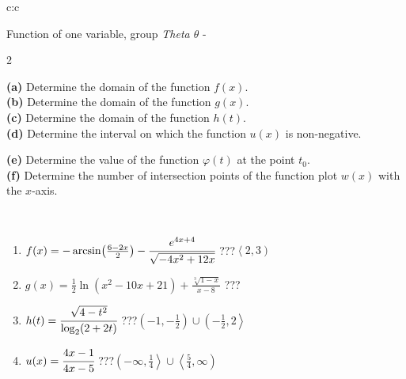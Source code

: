 \documentclass[10pt]{report}
\begin{document}
\begin{tabular}{c:c}
\begin{minipage}[c][104.5mm][t]{0.5\linewidth}
\begin{center}
\vspace{7mm}
{\huge Function of one variable, group \textit{Theta $\theta$} -}\\[5mm]
\begin{minipage}{0.95\linewidth}
\begin{center}
{\small \begin{multicols}{2} \raggedright
\textbf{(a)} Determine the domain of the function \(f(x)\). \\[1mm]
\textbf{(b)} Determine the domain of the function \(g(x)\). \\[1mm]
\textbf{(c)} Determine the domain of the function \(h(t)\). \\[1mm]
\textbf{(d)} Determine the interval on which the function \(u(x)\) is non-negative. \par \columnbreak
\textbf{(e)} Determine the value of the function \(\varphi(t)\) at the point \(t_0\). \\[1mm]
\textbf{(f)} Determine the number of intersection points of the function plot \(w(x)\) with the \(x\)-axis. \\[1mm]
\end{multicols}
}
\end{center}
\end{minipage}
\\[4mm]
\begin{minipage}{0.79\linewidth}
\begin{center}
\begin{varwidth}{\linewidth}
\begin{enumerate}
\small
\item $f(x) = -\arcsin\!\left( \frac{6-2x}{2} \right) - \cfrac{e^{4x+4}}{\sqrt{-4x^2+12x}}$\quad \dotfill\; ???\;\dotfill \quad $\left\langle2 , 3\right)$
\item $g(x) = \frac{1}{2} \ln{\!(x^2-10x+21)}+\frac{\sqrt[3]{1-x}}{x-8}$\quad \dotfill\; ???\;\dotfill {}
\item $h(t) = \cfrac{\sqrt{4-t^2}}{\log_2(2+2t)}$\quad \dotfill\; ???\;\dotfill \quad $\left(-1 , -\frac{1}{2}\right)\cup\left(-\frac{1}{2} , 2\right\rangle$
\item $u(x) = \cfrac{4x-1}{4x-5}$\quad \dotfill\; ???\;\dotfill \quad $\left(-\infty , \frac{1}{4}\right\rangle\cup\left\langle\frac{5}{4} , \infty\right)$

\end{enumerate}
\end{varwidth}
\end{center}
\end{minipage}
\end{center}
\end{minipage}
\end{tabular}
\end{document}
